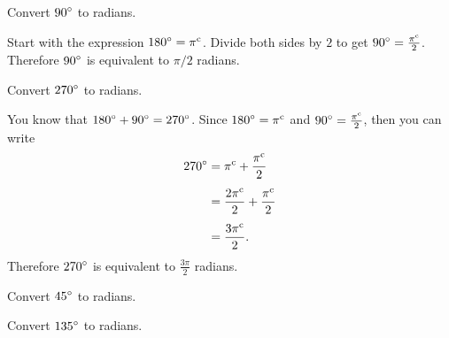\documentclass[a4paper,oneside,12pt]{article}
\begin{document}
\begin{example}
Convert ${90}^{\circ}$ to radians.
\end{example}

\begin{solution}
Start with the expression ${180}^{\circ} = {\pi}^{\rm c}$.  Divide both
sides by $2$ to get ${90}^{\circ} = \frac{{\pi}^{\rm c}}{2}$.  Therefore
${90}^{\circ}$ is equivalent to $\pi / 2$ radians.
\end{solution}

\begin{example}
Convert ${270}^{\circ}$ to radians.
\end{example}

\begin{solution}
You know that ${180}^{\circ} + {90}^{\circ} = {270}^{\circ}$.  Since
${180}^{\circ} = {\pi}^{\rm c}$ and
${90}^{\circ} = \frac{{\pi}^{\rm c}}{2}$, then you can write
\begin{align*}
{270}^{\circ}
&=
{\pi}^{\rm c} + \frac{{\pi}^{\rm c}}{2} \\[4pt]
&=
\frac{{2\pi}^{\rm c}}{2} + \frac{{\pi}^{\rm c}}{2} \\[4pt]
&=
\frac{{3\pi}^{\rm c}}{2}.
\end{align*}
Therefore ${270}^{\circ}$ is equivalent to $\frac{3\pi}{2}$ radians.
\end{solution}

\begin{exercise}
Convert ${45}^{\circ}$ to radians.
\end{exercise}


\begin{exercise}
Convert ${135}^{\circ}$ to radians.
\end{exercise}

\end{document}
